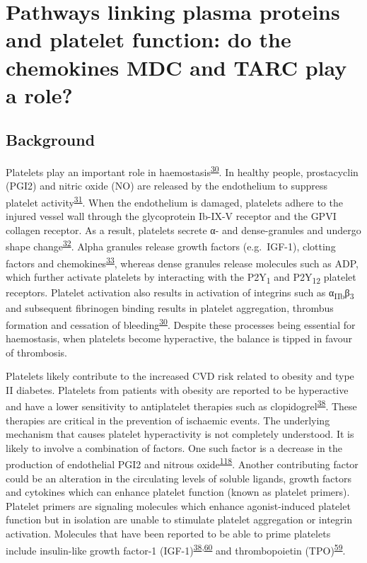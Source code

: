 \documentclass[11pt,twoside]{bristolthesis}
\begin{document}
\hypertarget{chemokine-platelets}{%
\chapter{Pathways linking plasma proteins and platelet function: do the chemokines MDC and TARC play a role?}\label{chemokine-platelets}}

\hypertarget{background-3}{%
\section{Background}\label{background-3}}

Platelets play an important role in haemostasis\textsuperscript{\protect\hyperlink{ref-Rivera2009}{30}}. In healthy people, prostacyclin (PGI2) and nitric oxide (NO) are released by the endothelium to suppress platelet activity\textsuperscript{\protect\hyperlink{ref-Yau2015}{31}}. When the endothelium is damaged, platelets adhere to the injured vessel wall through the glycoprotein Ib-IX-V receptor and the GPVI collagen receptor. As a result, platelets secrete α- and dense-granules and undergo shape change\textsuperscript{\protect\hyperlink{ref-Badimon2012}{32}}. Alpha granules release growth factors (e.g.~IGF-1), clotting factors and chemokines\textsuperscript{\protect\hyperlink{ref-Gear2003}{33}}, whereas dense granules release molecules such as ADP, which further activate platelets by interacting with the P2Y\textsubscript{1} and P2Y\textsubscript{12} platelet receptors. Platelet activation also results in activation of integrins such as α\textsubscript{IIb}β\textsubscript{3} and subsequent fibrinogen binding results in platelet aggregation, thrombus formation and cessation of bleeding\textsuperscript{\protect\hyperlink{ref-Rivera2009}{30}}. Despite these processes being essential for haemostasis, when platelets become hyperactive, the balance is tipped in favour of thrombosis.

Platelets likely contribute to the increased CVD risk related to obesity and type II diabetes. Platelets from patients with obesity are reported to be hyperactive and have a lower sensitivity to antiplatelet therapies such as clopidogrel\textsuperscript{\protect\hyperlink{ref-Nardin2015}{38}}. These therapies are critical in the prevention of ischaemic events. The underlying mechanism that causes platelet hyperactivity is not completely understood. It is likely to involve a combination of factors. One such factor is a decrease in the production of endothelial PGI2 and nitrous oxide\textsuperscript{\protect\hyperlink{ref-BelindeChantemele2012a}{118}}. Another contributing factor could be an alteration in the circulating levels of soluble ligands, growth factors and cytokines which can enhance platelet function (known as platelet primers). Platelet primers are signaling molecules which enhance agonist-induced platelet function but in isolation are unable to stimulate platelet aggregation or integrin activation. Molecules that have been reported to be able to prime platelets include insulin-like growth factor-1 (IGF-1)\textsuperscript{\protect\hyperlink{ref-Nardin2015}{38},\protect\hyperlink{ref-Blair2015}{60}} and thrombopoietin (TPO)\textsuperscript{\protect\hyperlink{ref-Maury2010a}{59}}.
\end{document}
